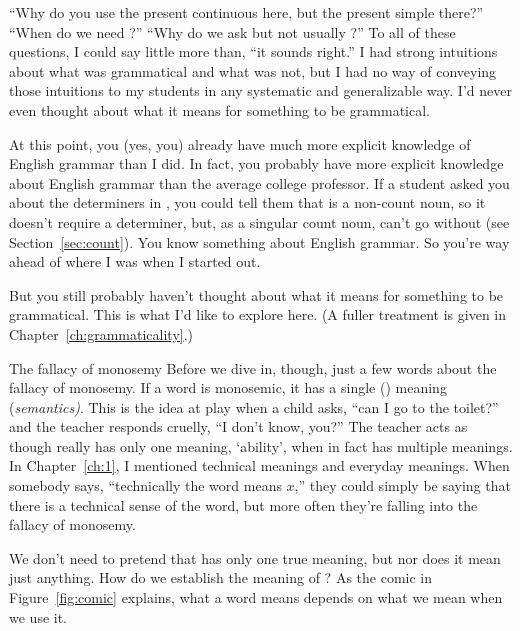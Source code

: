 \enquote{Why do you use the present continuous here, but the present simple there?} \enquote{When do we need ?} \enquote{Why do we ask  but not usually ?} To all of these questions, I could say little more than, \enquote{it sounds right.} I had strong intuitions about what was grammatical and what was not, but I had no way of conveying those intuitions to my students in any systematic and generalizable way. I'd never even thought about what it means for something to be grammatical.

At this point, you (yes, you) already have much more explicit knowledge of English grammar than I did. In fact, you probably have more explicit knowledge about English grammar than the average college professor. If a student asked you about the determiners in , you could tell them that  is a non-count noun, so it doesn't require a determiner, but, as a singular count noun,  can't go without (see Section~\ref{sec:count}). You know something about English grammar. So you're way ahead of where I was when I started out.

But you still probably haven't thought about what it means for something to be grammatical. This is what I'd like to explore here. (A fuller treatment is given in Chapter~\ref{ch:grammaticality}.)

\begin{tblsframed}{The fallacy of monosemy} \label{sec:fallacy-of-monosemy}
    Before we dive in, though, just a few words about the fallacy of monosemy. If a word is monosemic, it has a single () meaning (\textit{\emph{sem}antics)}. This is the idea at play when a child asks, \enquote{can I go to the toilet?} and the teacher responds cruelly, \enquote{I don't know,  you?} The teacher acts as though  really has only one meaning, `ability', when in fact  has multiple meanings. In Chapter~\ref{ch:1}, I mentioned technical meanings and everyday meanings. When somebody says, \enquote{technically the word means $x$,} they could simply be saying that there is a technical sense of the word, but more often they're falling into the fallacy of monosemy.
\end{tblsframed}\label{sec:monosemy}

We don't need to pretend that  has only one true meaning, but nor does it mean just anything. How do we establish the meaning of ? As the comic in Figure~\ref{fig:comic} explains, what a word means depends on what we mean when we use it.

